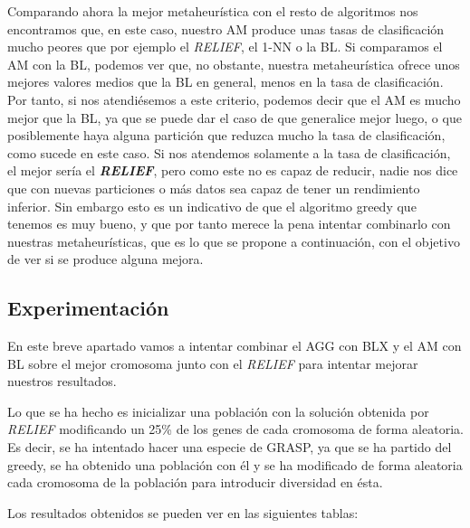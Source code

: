 \documentclass[11pt,a4paper]{article}
\begin{document}
Comparando ahora la mejor metaheurística con el resto de algoritmos nos encontramos que, en este caso, nuestro AM produce unas
tasas de clasificación mucho peores que por ejemplo el \textit{RELIEF}, el 1-NN o la BL. Si comparamos el AM con la BL, podemos
ver que, no obstante, nuestra metaheurística ofrece unos mejores valores medios que la BL en general, menos en la tasa de
clasificación. Por tanto, si nos atendiésemos a este criterio, podemos decir que el AM es mucho mejor que la BL, ya que se puede
dar el caso de que generalice mejor luego, o que posiblemente haya alguna partición que reduzca mucho la tasa de clasificación,
como sucede en este caso. Si nos atendemos solamente a la tasa de clasificación, el mejor sería el \textbf{\textit{RELIEF}}, 
pero como este no es capaz de reducir, nadie nos dice que con nuevas particiones o más datos sea capaz de tener un rendimiento
inferior. Sin embargo esto es un indicativo de que el algoritmo greedy que tenemos es muy bueno, y que por tanto merece la pena
intentar combinarlo con nuestras metaheurísticas, que es lo que se propone a continuación, con el objetivo de ver si se produce
alguna mejora.

\subsection{Experimentación}

En este breve apartado vamos a intentar combinar el AGG con BLX y el AM con BL sobre el mejor cromosoma junto con el
\textit{RELIEF} para intentar mejorar nuestros resultados.

Lo que se ha hecho es inicializar una población con la solución obtenida por \textit{RELIEF} modificando un 25\% de los genes
de cada cromosoma de forma aleatoria. Es decir, se ha intentado hacer una especie de GRASP, ya que se ha partido del greedy,
se ha obtenido una población con él y se ha modificado de forma aleatoria cada cromosoma de la población para introducir
diversidad en ésta.

Los resultados obtenidos se pueden ver en las siguientes tablas:
\end{document}

